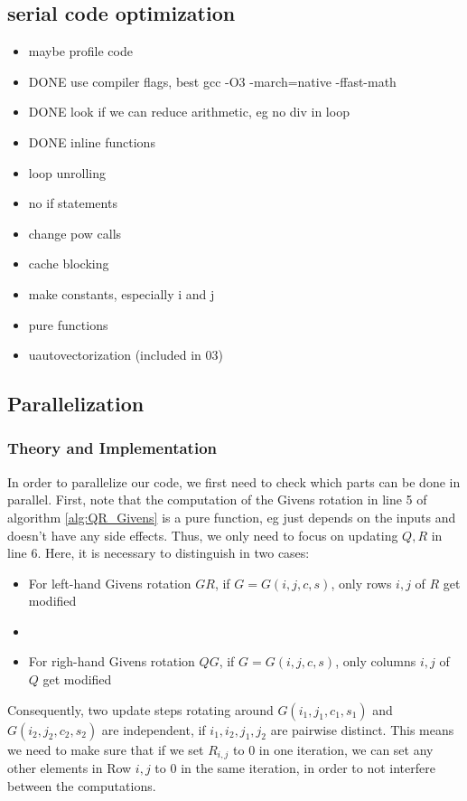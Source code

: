 \documentclass[a4paper]{scrartcl}
\begin{document}
        \subsection{serial code optimization}
            \begin{itemize}
                \item maybe profile code
                \item DONE use compiler flags, best gcc -O3 -march=native -ffast-math
                \item DONE look if we can reduce arithmetic, eg no div in loop
                \item DONE inline functions
                \item loop unrolling
                \item no if statements
                \item change pow calls
                \item cache blocking
                \item make constants, especially i and j
                \item pure functions
                \item uautovectorization (included in 03)
            \end{itemize}


        \subsection{Parallelization}
            \subsubsection{Theory and Implementation}
                In order to parallelize our code, we first need to check which
                parts can be done in parallel. First, note that the computation
                of the Givens rotation in line 5 of algorithm
                \ref{alg:QR_Givens} is a pure function, eg just depends on the
                inputs and doesn't have any side effects. Thus, we only need to
                focus on updating $Q,R$ in line 6. Here, it is necessary to
                distinguish in two cases:
                \begin{itemize}
                    \item For left-hand Givens rotation $GR$, if $G=G(i,j,c,s)$,
                    only rows $i,j$ of $R$ get modified
                    \item \item For righ-hand Givens rotation $QG$, if
                    $G=G(i,j,c,s)$, only columns $i,j$ of $Q$ get modified
                \end{itemize}
                Consequently, two update steps rotating around
                $G(i_1,j_1,c_1,s_1)$ and $G(i_2,j_2,c_2,s_2)$ are independent,
                if $i_1, i_2, j_1, j_2$ are pairwise distinct. This means we
                need to make sure that if we set $R_{i,j}$ to 0 in one
                iteration, we can set any other elements in Row $i,j$ to 0 in
                the same iteration, in order to not interfere between the
                computations.
                
\end{document}
